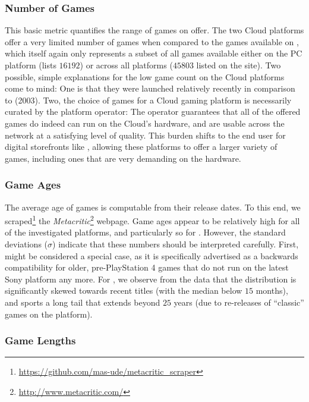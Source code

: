 \subsubsection{Number of Games}

This basic metric quantifies the range of games on offer. The two Cloud platforms offer a very limited number of games when compared to the games available on \steam, which itself again only represents a subset of all games available either on the PC platform (\metacritic lists $16192$) or across all platforms ($45803$ listed on the site). Two possible, simple explanations for the low game count on the Cloud platforms come to mind: One is that they were launched relatively recently in comparison to \steam (2003). Two, the choice of games for a Cloud gaming platform is necessarily curated by the platform operator: The operator guarantees that all of the offered games do indeed can run on the Cloud's hardware, and are usable across the network at a satisfying level of quality. This burden shifts to the end user for digital storefronts like \steam, allowing these platforms to offer a larger variety of games, including ones that are very demanding on the hardware.


\subsubsection{Game Ages}

The average age of games is computable from their release dates. To this end, we scraped\footnote{\url{https://github.com/mas-ude/metacritic_scraper}} the \textit{Metacritic}\footnote{\url{http://www.metacritic.com/}} webpage. Game ages appear to be  relatively high for all of the investigated platforms, and particularly so for \psnow. However, the standard deviations ($\sigma$) indicate that these numbers should be interpreted carefully. First, \psnow might be considered a special case, as it is specifically advertised as a backwards compatibility for older, pre-PlayStation 4 games that do not run on the latest Sony platform any more. For \steam, we observe from the data that the distribution is significantly skewed towards recent titles (with the median below $15$ months), and sports a long tail that extends beyond $25$ years (due to re-releases of ``classic'' games on the platform).


\subsubsection{Game Lengths}

